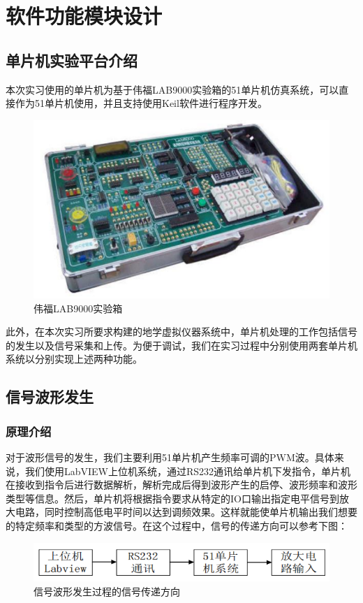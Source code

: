 \documentclass[UTF8]{article}
\begin{document}
%
\section{软件功能模块设计}
\subsection{单片机实验平台介绍}
本次实习使用的单片机为基于伟福LAB9000实验箱的51单片机仿真系统，可以直接作为51单片机使用，并且支持使用Keil软件进行程序开发。
\begin{figure}[H]
    \centering %
    \includegraphics[width=.6\textwidth]{figure/实验箱.png} 
    \caption{伟福LAB9000实验箱} %
\end{figure}

此外，在本次实习所要求构建的地学虚拟仪器系统中，单片机处理的工作包括信号的发生以及信号采集和上传。为便于调试，我们在实习过程中分别使用两套单片机系统以分别实现上述两种功能。

\subsection{信号波形发生}
\subsubsection{原理介绍}
对于波形信号的发生，我们主要利用51单片机产生频率可调的PWM波。具体来说，我们使用LabVIEW上位机系统，通过RS232通讯给单片机下发指令，单片机在接收到指令后进行数据解析，解析完成后得到波形产生的启停、波形频率和波形类型等信息。然后，单片机将根据指令要求从特定的IO口输出指定电平信号到放大电路，同时控制高低电平时间以达到调频效果。这样就能使单片机输出我们想要的特定频率和类型的方波信号。在这个过程中，信号的传递方向可以参考下图：
\begin{figure}[H]
    \centering %
    \includegraphics[width=.8\textwidth]{figure/信号波形产生-信号方向示意.png} 
    \caption{信号波形发生过程的信号传递方向} %
\end{figure}
\end{document}

